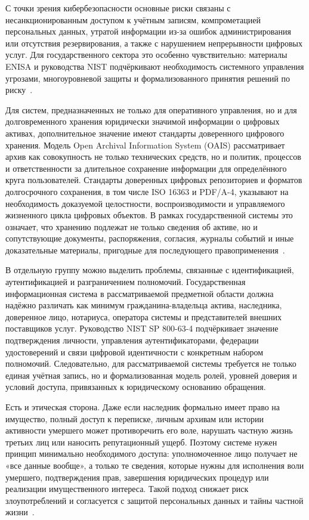 С точки зрения кибербезопасности основные риски связаны с несанкционированным доступом к учётным записям, компрометацией персональных данных, утратой информации из-за ошибок администрирования или отсутствия резервирования, а также с нарушением непрерывности цифровых услуг. Для государственного сектора это особенно чувствительно: материалы ENISA и руководства NIST подчёркивают необходимость системного управления угрозами, многоуровневой защиты и формализованного принятия решений по риску~\cite{enisaThreatLandscape2023, nist80053r5_2020, nist80030r1_2012, owaspASVS403}.

Для систем, предназначенных не только для оперативного управления, но и для долговременного хранения юридически значимой информации о цифровых активах, дополнительное значение имеют стандарты доверенного цифрового хранения. Модель Open Archival Information System (OAIS) рассматривает архив как совокупность не только технических средств, но и политик, процессов и ответственности за длительное сохранение информации для определённого круга пользователей. Стандарты доверенных цифровых репозиториев и форматов долгосрочного сохранения, в том числе ISO 16363 и PDF/A-4, указывают на необходимость доказуемой целостности, воспроизводимости и управляемого жизненного цикла цифровых объектов. В рамках государственной системы это означает, что хранению подлежат не только сведения об активе, но и сопутствующие документы, распоряжения, согласия, журналы событий и иные доказательные материалы, пригодные для последующего правоприменения~\cite{iso14721_2025, iso16363_2025, iso19005_4_2020}.

В отдельную группу можно выделить проблемы, связанные с идентификацией, аутентификацией и разграничением полномочий. Государственная информационная система в рассматриваемой предметной области должна надёжно различать как минимум гражданина-владельца актива, наследника, доверенное лицо, нотариуса, оператора системы и представителей внешних поставщиков услуг. Руководство NIST SP 800-63-4 подчёркивает значение подтверждения личности, управления аутентификаторами, федерации удостоверений и связи цифровой идентичности с конкретным набором полномочий. Следовательно, для рассматриваемой системы требуется не только единая учётная запись, но и формализованная модель ролей, уровней доверия и условий доступа, привязанных к юридическому основанию обращения.

Есть и этическая сторона. Даже если наследник формально имеет право на имущество, полный доступ к переписке, личным архивам или истории активности умершего может противоречить его воле, нарушать частную жизнь третьих лиц или наносить репутационный ущерб. Поэтому системе нужен принцип минимально необходимого доступа: уполномоченное лицо получает не «все данные вообще», а только те сведения, которые нужны для исполнения воли умершего, подтверждения прав, завершения юридических процедур или реализации имущественного интереса. Такой подход снижает риск злоупотреблений и согласуется с защитой персональных данных и тайны частной жизни~\cite{Edwards2013PostMortemPrivacy, Harbinja2022DigitalDeath}.

